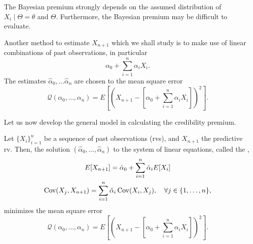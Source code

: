 \documentclass[notoc,notitlepage]{tufte-book}
\begin{document}
The Bayesian premium strongly depends on the assumed distribution of $X_i \mid
\Theta = \theta$ and $\Theta$. Furthermore, the Bayesian premium may be
difficult to evaluate.

Another method to estimate $X_{n+1}$ which we shall study is to make use of
linear combinations of past observations, in particular
\begin{equation*}
  \alpha_0 + \sum_{i=1}^{n} \alpha_i X_i.
\end{equation*}
The estimates $\hat{\alpha}_0, \ldots \hat{\alpha}_n$ are chosen to
 the mean square error
\begin{equation*}
  \mathcal{Q}(\alpha_0, \ldots, \alpha_n) = E \left[ \left( X_{n+1} - \left[
  \alpha_0 + \sum_{i=1}^{n} \alpha_i X_i \right] \right)^2 \right].
\end{equation*}

Let us now develop the general model in calculating the credibility premium.

\begin{thm}\label{thm:general_model_for_credibility_premium}
  Let $\{ X_i \}_{i=1}^n$ be a sequence of past observations (rvs), and
  $X_{n+1}$ the predictive rv. Then, the solution $(\hat{\alpha}_0, \ldots,
  \hat{\alpha}_n)$ to the system of linear equations, called the ,
  \begin{gather*}
    E[X_{n+1}] = \hat{\alpha}_0  + \sum_{i=1}^{n} \hat{\alpha}_i E[X_i] \\
    \operatorname{Cov}(X_j, X_{n+1}) = \sum_{i=1}^{n} \hat{\alpha}_i \operatorname{Cov}(X_i, X_j), \quad
    \forall j \in \{ 1, \ldots, n \},
  \end{gather*}
  minimizes the mean square error
  \begin{equation*}
    \mathcal{Q}(\alpha_0, \ldots, \alpha_n) = E \left[ \left( X_{n+1} - \left[
    \alpha_0 + \sum_{i=1}^{n} \alpha_i X_i \right] \right)^2 \right].
  \end{equation*}
\end{thm}
\end{document}
